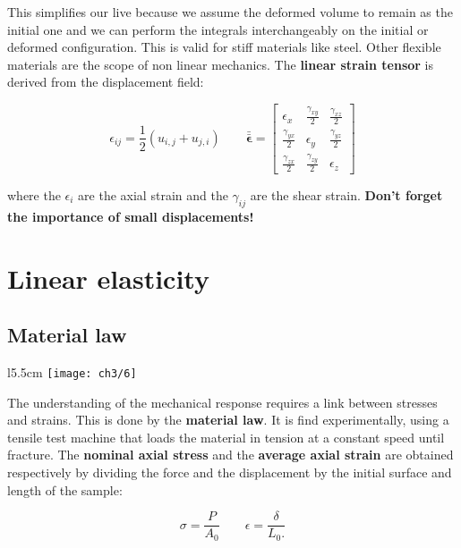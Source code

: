 			This simplifies our live because we assume the deformed volume to remain as the initial one and we can perform the integrals interchangeably on the initial or deformed configuration. This is valid for stiff materials like steel. Other flexible materials are the scope of non linear mechanics. The \textbf{linear strain tensor} is derived from the displacement field:
			
			\begin{equation}
			\epsilon _{ij}= \frac{1}{2} (u_{i,j} + u_{j,i})\qquad \bm{\bar{ \bar{\epsilon}}} = 
			\left[
			\begin{array}{ccc}
			\epsilon _x &\frac{\gamma _{xy}}{2} &\frac{\gamma _{xz}}{2} \\
			\frac{\gamma _{yx}}{2} & \epsilon _y & \frac{\gamma _{yz}}{2}\\
			\frac{\gamma _{zx}}{2} & \frac{\gamma _{zy}}{2} & \epsilon _z
			\end{array}						
			\right]
			\end{equation}
			
			where the $\epsilon _i$ are the axial strain and the $\gamma _{ij}$ are the shear strain. \textbf{Don't forget the importance of small displacements!}
			
	\section{Linear elasticity}
		\subsection{Material law}
			\begin{wrapfigure}[8]{l}{5.5cm}
			\vspace{-5mm}	
			\texttt{[image: ch3/6]}
			\label{fig:3.6}
			\end{wrapfigure}		
			The understanding of the mechanical response requires a link between stresses and strains. This is done by the \textbf{material law}. It is find experimentally, using a tensile test machine that loads the material in tension at a constant speed until fracture. The \textbf{nominal axial stress} and the \textbf{average axial strain} are obtained respectively by dividing the force and the displacement by the initial surface and length of the sample:
			
			\begin{equation}
			\sigma = \frac{P}{A_0} \qquad \epsilon = \frac{\delta}{L_0.}	
			\end{equation}			 
			
